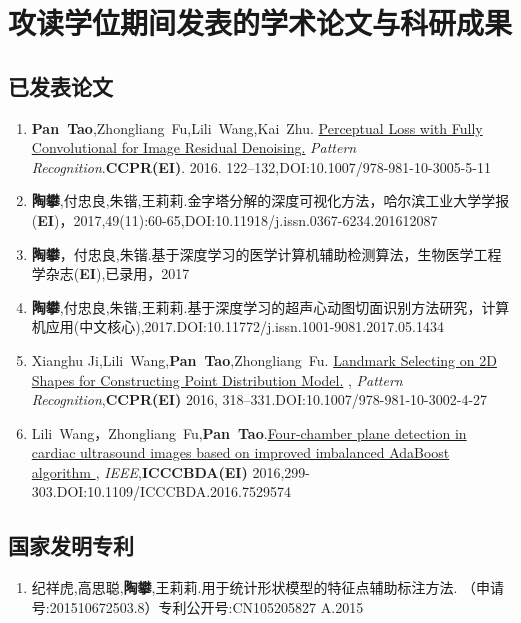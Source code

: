 
\chapter{攻读学位期间发表的学术论文与科研成果}

\section*{已发表论文}
\begin{enumerate}

\item {\textbf{Pan~Tao},Zhongliang~Fu,Lili~Wang,Kai~Zhu.
{\href{http://link.springer.com/10.1007/978-981-10-3005-5_11}
{Perceptual Loss with Fully Convolutional for Image Residual Denoising.}
{ \textit{Pattern Recognition}}.\textbf{CCPR(EI)}. 2016. 122--132,DOI:10.1007/978-981-10-3005-5-11}}

\item {\textbf{陶攀},付忠良,朱锴,王莉莉.{金字塔分解的深度可视化方法}，{哈尔滨工业大学学报(\textbf{EI})}，2017,49(11):60-65,DOI:10.11918/j.issn.0367-6234.201612087}

\item{\textbf{陶攀}，付忠良,朱锴.{基于深度学习的医学计算机辅助检测算法}，{生物医学工程学杂志(\textbf{EI}),已录用}，2017}
\item {\textbf{陶攀},付忠良,朱锴,王莉莉.{基于深度学习的超声心动图切面识别方法研究}，{计算机应用(中文核心),2017.DOI:10.11772/j.issn.1001-9081.2017.05.1434} }

\item{Xianghu Ji,Lili~Wang,\textbf{Pan~Tao},Zhongliang~Fu.
{\href{http://link.springer.com/10.1007/978-981-10-3002-4_27}{Landmark Selecting on 2D Shapes for Constructing Point Distribution Model.}
,{ \textit{Pattern Recognition}},\textbf{CCPR(EI)} 2016, 318--331.DOI:10.1007/978-981-10-3002-4-27}}

\item {Lili~Wang，Zhongliang~Fu,\textbf{Pan~Tao}.{\href{http://ieeexplore.ieee.org/document/7529574}
{Four-chamber plane detection in cardiac ultrasound images based on improved imbalanced AdaBoost algorithm },
{ \textit{IEEE}},\textbf{ICCCBDA(EI)} 2016,299-303.DOI:10.1109/ICCCBDA.2016.7529574}}

\end{enumerate}
\section*{国家发明专利}
\begin{enumerate}
\item { 纪祥虎,高思聪,\textbf{陶攀},王莉莉.{用于统计形状模型的特征点辅助标注方法. {（申请号:201510672503.8）专利公开号:CN105205827 A}.{2015}}}
\end{enumerate}
